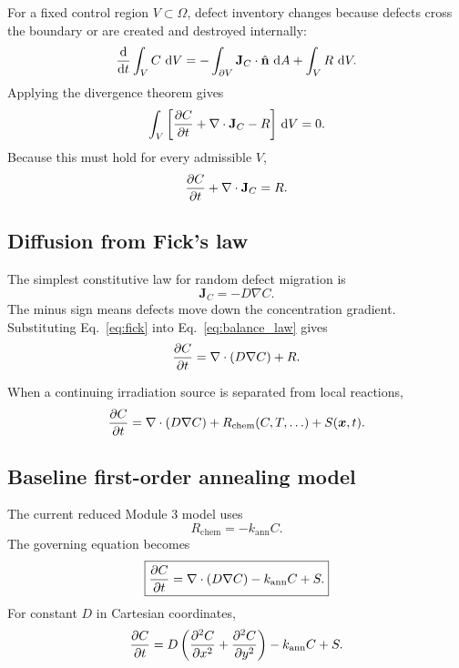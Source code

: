 \documentclass[11pt]{article}
\newcommand{\xv}{\bm{x}}
\newcommand{\Om}{\Omega}
\providecommand{\dd}{\,\mathrm{d}}
\begin{document}
For a fixed control region $V\subset\Om$, defect inventory changes because defects cross the boundary or are created and destroyed internally:
\begin{equation}
\dv{}{t}\int_V C\,\dd V
=
-\int_{\partial V}\mathbf{J}_C\cdot\hat{\mathbf n}\,\dd A
+\int_V R\,\dd V.
\end{equation}
Applying the divergence theorem gives
\begin{equation}
\int_V
\left[
\pdv{C}{t}+\nabla\cdot\mathbf{J}_C-R
\right]\dd V=0.
\end{equation}
Because this must hold for every admissible $V$,
\begin{equation}
\pdv{C}{t}+\nabla\cdot\mathbf{J}_C=R.
\label{eq:balance_law}
\end{equation}

\subsection{Diffusion from Fick's law}

The simplest constitutive law for random defect migration is
\begin{equation}
\mathbf{J}_C=-D\nabla C.
\label{eq:fick}
\end{equation}
The minus sign means defects move down the concentration gradient. Substituting Eq.~\eqref{eq:fick} into Eq.~\eqref{eq:balance_law} gives
\begin{equation}
\pdv{C}{t}
=
\nabla\cdot(D\nabla C)+R.
\label{eq:general_diffusion_reaction}
\end{equation}

When a continuing irradiation source is separated from local reactions,
\begin{equation}
\pdv{C}{t}
=
\nabla\cdot(D\nabla C)
+R_{\mathrm{chem}}(C,T,\ldots)
+S(\xv,t).
\label{eq:general_with_source}
\end{equation}

\subsection{Baseline first-order annealing model}

The current reduced Module 3 model uses
\begin{equation}
R_{\mathrm{chem}}=-k_{\mathrm{ann}}C.
\end{equation}
The governing equation becomes
\begin{equation}
\boxed{
\pdv{C}{t}
=
\nabla\cdot(D\nabla C)
-k_{\mathrm{ann}}C
+S.
}
\label{eq:module3_dimensional}
\end{equation}
For constant $D$ in Cartesian coordinates,
\begin{equation}
\pdv{C}{t}
=
D\left(
\pdv[2]{C}{x}+\pdv[2]{C}{y}
\right)
-k_{\mathrm{ann}}C
+S.
\label{eq:module3_constant}
\end{equation}
\end{document}
